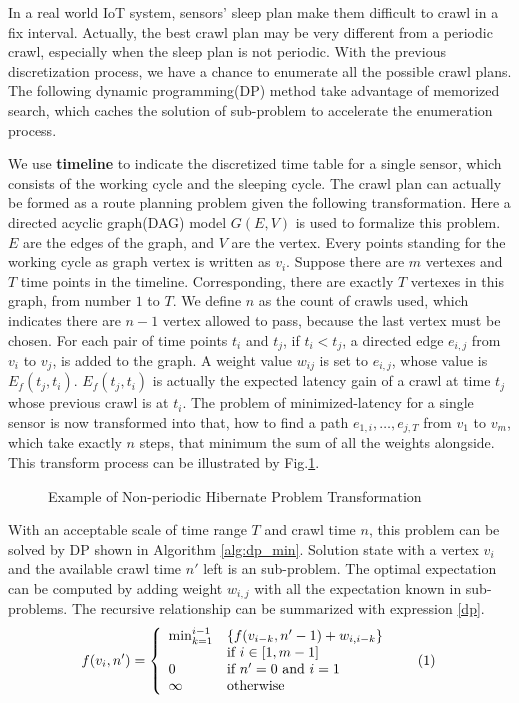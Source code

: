 \documentclass[conference]{IEEEtran}
\newcommand\numberthis{\addtocounter{equation}{1}\tag{\theequation}}
\begin{document}
In a real world IoT system, sensors' sleep plan make them difficult to crawl in a fix interval. 
Actually, the best crawl plan may be very different from a periodic crawl, especially when the sleep plan is not periodic.
With the previous discretization process, we have a chance to enumerate all the possible crawl plans. 
The following dynamic programming(DP) method take advantage of memorized search, which caches the solution of sub-problem to accelerate the enumeration process.

We use \textbf{timeline} to indicate the discretized time table for a single sensor, which consists of the working cycle and the sleeping cycle.
The crawl plan can actually be formed as a route planning problem given the following transformation.
Here a directed acyclic graph(DAG) model $G(E,V)$ is used to formalize this problem.
$E$ are the edges of the graph, and $V$ are the vertex. 
Every points standing for the working cycle as graph vertex is written as $v_i$. 
Suppose there are $m$ vertexes and $T$ time points in the timeline. 
Corresponding, there are exactly $T$ vertexes in this graph, from number $1$ to $T$. 
We define $n$ as the count of crawls used, which indicates there are $n-1$ vertex allowed to pass, because the last vertex must be chosen. 
For each pair of time points $t_i$ and $t_j$, if $t_i<t_j$, a directed edge $e_{i,j}$ from $v_i$ to $v_j$, is added to the graph. 
A weight value $w_{ij}$ is set to $e_{i,j}$, whose value is $E_f(t_j, t_i)$.
$E_f(t_j, t_i)$ is actually the expected latency gain of a crawl at time $t_j$ whose previous crawl is at $t_i$.
The problem of minimized-latency for a single sensor is now transformed into that, how to find a path $e_{1,i},\ldots,e_{j,T}$ from $v_1$ to $v_m$, which take exactly $n$ steps, that minimum the sum of all the weights alongside. 
This transform process can be illustrated by Fig.\ref{fig:problemtrans}.
\begin{figure}
	\centering
	
	\captionsetup{justification=centering}
	\caption{Example of Non-periodic Hibernate Problem Transformation}
	\label{fig:problemtrans}
\end{figure}

With an acceptable scale of time range $T$ and crawl time $n$, this problem can be solved by DP shown in Algorithm \ref{alg:dp_min}. 
Solution state with a vertex $v_i$ and the available crawl time $n'$ left is an sub-problem. 
The optimal expectation can be computed by adding weight $w_{i,j}$ with all the expectation known in sub-problems. 
The recursive relationship can be summarized with expression \eqref{dp}.
\[f(v_i, n')=\left\{
\begin{array}{ll}
\min_{k=1}^{i-1} & \{f(v_{i-k}, n'-1)+w_{i,i-k}\}\\
& \text{if } i\in[1, m-1]\\
0 & \text{if } n'=0 \text{ and } i=1\\
\infty & \text{otherwise}
\end{array}\numberthis \label{dp}
\right.
\]
\end{document}
